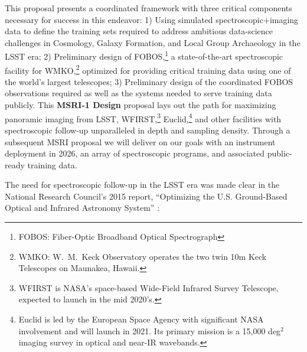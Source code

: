 This proposal presents a coordinated framework with three critical
components necessary for success in this endeavor: 1) Using simulated
spectroscopic$+$imaging data to define the training sets required to
address ambitious data-science challenges in Cosmology, Galaxy
Formation, and Local Group Archaeology in the LSST era; 2) Preliminary
design of FOBOS,\footnote{FOBOS: Fiber-Optic Broadband Optical
Spectrograph} a state-of-the-art spectroscopic facility for
WMKO,\footnote{WMKO: W.~M.\ Keck Observatory operates the two twin 10m
Keck Telescopes on Maunakea, Hawaii.} optimized for providing critical
training data using one of the world's largest telescopes; 3)
Preliminary design of the coordinated FOBOS observations required as
well as the systems needed to serve training data publicly.  This {\bf
MSRI-1 Design} proposal lays out the path for maximizing panoramic
imaging from LSST, WFIRST,\footnote{WFIRST is NASA's space-based
Wide-Field Infrared Survey Telescope, expected to launch in the mid
2020's.} Euclid,\footnote{Euclid is led by the European Space Agency
with significant NASA involvement and will launch in 2021. Its primary
mission is a 15,000 deg$^2$ imaging survey in optical and near-IR
wavebands.} and other facilities with spectroscopic follow-up
unparalleled in depth and sampling density.  Through a subsequent MSRI
proposal we will deliver on our goals with an instrument deployment in
2026, an array of spectroscopic programs, and associated public-ready
training data.

The need for spectroscopic follow-up in the LSST era was made clear in
the National Research Council's 2015 report, ``Optimizing the U.S.
Ground-Based Optical and Infrared Astronomy System'' \citep{NAP21722}:
%
\noindent{}

